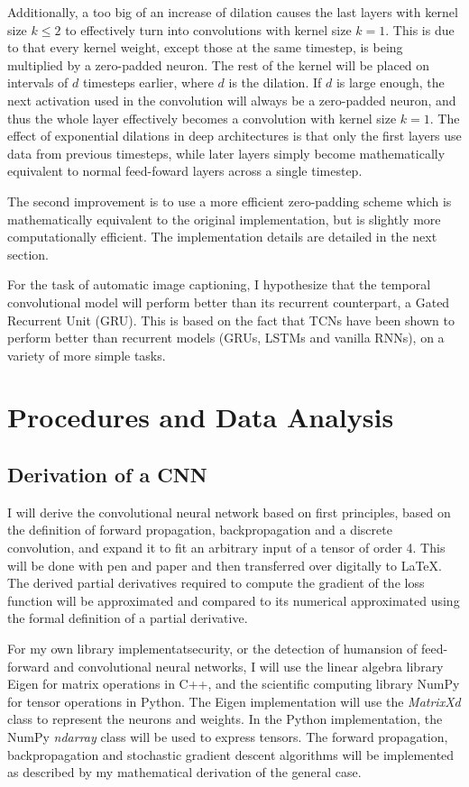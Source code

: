 \documentclass[a4paper, twoside]{article}
\begin{document}
Additionally, a too big of an increase of dilation causes the last layers with kernel size $k \leq 2$ to effectively turn into convolutions with kernel size $k=1$. This is due to that every kernel weight, except those at the same timestep, is being multiplied by a zero-padded neuron. The rest of the kernel will be placed on intervals of $d$ timesteps earlier, where $d$ is the dilation. If $d$ is large enough, the next activation used in the convolution will always be a zero-padded neuron, and thus the whole layer effectively becomes a convolution with kernel size $k=1$. The effect of exponential dilations in deep architectures is that only the first layers use data from previous timesteps, while later layers simply become mathematically equivalent to normal feed-foward layers across a single timestep.

The second improvement is to use a more efficient zero-padding scheme which is mathematically equivalent to the original implementation, but is slightly more computationally efficient. The implementation details are detailed in the next section.

For the task of automatic image captioning, I hypothesize that the temporal convolutional model will perform better than its recurrent counterpart, a Gated Recurrent Unit (GRU). This is based on the fact that TCNs have been shown \cite{tcn} to perform better than recurrent models (GRUs, LSTMs and vanilla RNNs), on a variety of more simple tasks.

\section{Procedures and Data Analysis}
\subsection{Derivation of a CNN}
I will derive the convolutional neural network based on first principles, based on the definition of forward propagation, backpropagation and a discrete convolution, and expand it to fit an arbitrary input of a tensor of order 4. This will be done with pen and paper and then transferred over digitally to LaTeX. The derived partial derivatives required to compute the gradient of the loss function will be approximated and compared to its numerical approximated using the formal definition of a partial derivative.

For my own library implementatsecurity, or the detection of humansion of feed-forward and convolutional neural networks, I will use the linear algebra library Eigen \cite{eigen} for matrix operations in C++, and the scientific computing library NumPy \cite{numpy} for tensor operations in Python. The Eigen implementation will use the \textit{MatrixXd} class to represent the neurons and weights. In the Python implementation, the NumPy \textit{ndarray} class will be used to express tensors. The forward propagation, backpropagation and stochastic gradient descent algorithms will be implemented as described by my mathematical derivation of the general case.
\end{document}
